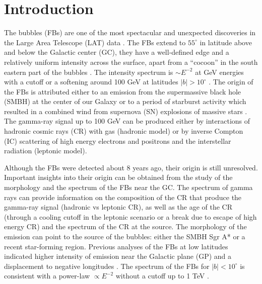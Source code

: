 \section{Introduction}



The \Fermi bubbles (FBs) are one of the most spectacular and unexpected discoveries 
in the \Fermi Large Area Telescope (LAT) data \citep{2010ApJ...724.1044S}.
The FBs extend to $55^\circ$ in latitude above and below the Galactic center (GC),
they have a well-defined edge and a relatively uniform intensity across the surface, apart from a ``cocoon'' in the south eastern part of the bubbles
\citep{2012ApJ...753...61S, 2014ApJ...793...64A}.
The intensity spectrum is $\sim E^{-2}$ at GeV energies with a cutoff or a softening around 100 GeV at latitudes $|b| > 10^\circ$ \citep{2014ApJ...793...64A}.
The origin of the FBs is attributed either to an emission from the supermassive black hole (SMBH) at
the center of our Galaxy %
or to a period of starburst activity which resulted in a combined wind
from supernova (SN) explosions of massive stars %
\citep{2010ApJ...724.1044S}.
The gamma-ray signal up to 100 GeV can be produced either by interactions of hadronic cosmic rays (CR) with gas (hadronic model)
or by inverse Compton (IC) scattering of high energy electrons and positrons and the interstellar radiation (leptonic model).

Although the FBs were detected about 8 years ago, their origin is still unresolved.
Important insights into their origin can be obtained from the study of the morphology and the spectrum of the FBs near the GC.
The spectrum of gamma rays can provide information on the composition of the 
CR that produce the gamma-ray signal (hadronic vs leptonic CR),
as well as the age of the CR (through a cooling cutoff in the leptonic scenario or a break due to escape of high energy CR)
and the spectrum of the CR at the source.
The morphology of the emission can point to the source of the bubbles: either the SMBH Sgr A* or a recent star-forming region.
Previous analyses of the FBs at low latitudes indicated higher intensity of emission near the Galactic plane (GP) and a displacement
to negative longitudes \citep{2016ApJS..223...26A, 2017ApJ...840...43A, 2017JCAP...08..022S}.
The spectrum of the FBs for $|b| < 10^\circ$ is consistent with a power-law $\propto E^{-2}$ 
without a cutoff up to 1 TeV \citep{2017ApJ...840...43A}.

